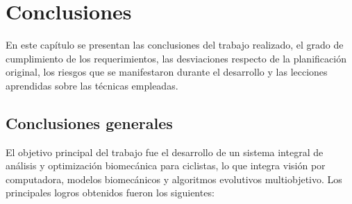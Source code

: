 
\chapter{Conclusiones}

\label{Chapter5}

En este capítulo se presentan las conclusiones del trabajo realizado, el grado
de cumplimiento de los requerimientos, las desviaciones respecto de la
planificación original, los riesgos que se manifestaron durante el desarrollo y
las lecciones aprendidas sobre las técnicas empleadas.


\section{Conclusiones generales}

El objetivo principal del trabajo fue el desarrollo de un sistema integral de
análisis y optimización biomecánica para ciclistas, lo que integra visión por
computadora, modelos biomecánicos y algoritmos evolutivos multiobjetivo. Los
principales logros obtenidos fueron los siguientes:

